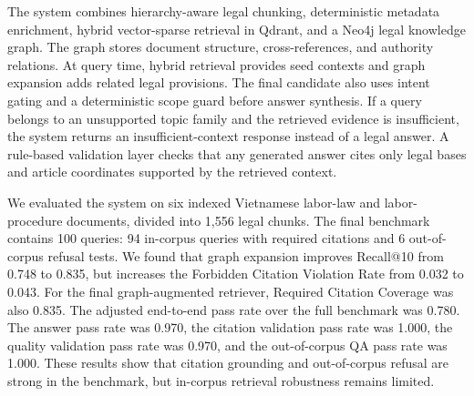 \documentclass[12pt,a4paper,oneside]{report}
\begin{document}
The system combines hierarchy-aware legal chunking, deterministic metadata enrichment, hybrid vector-sparse retrieval in Qdrant, and a Neo4j legal knowledge graph. The graph stores document structure, cross-references, and authority relations. At query time, hybrid retrieval provides seed contexts and graph expansion adds related legal provisions. The final candidate also uses intent gating and a deterministic scope guard before answer synthesis. If a query belongs to an unsupported topic family and the retrieved evidence is insufficient, the system returns an insufficient-context response instead of a legal answer. A rule-based validation layer checks that any generated answer cites only legal bases and article coordinates supported by the retrieved context.

We evaluated the system on six indexed Vietnamese labor-law and labor-procedure documents, divided into 1,556 legal chunks. The final benchmark contains 100 queries: 94 in-corpus queries with required citations and 6 out-of-corpus refusal tests. We found that graph expansion improves Recall@10 from 0.748 to 0.835, but increases the Forbidden Citation Violation Rate from 0.032 to 0.043. For the final graph-augmented retriever, Required Citation Coverage was also 0.835. The adjusted end-to-end pass rate over the full benchmark was 0.780. The answer pass rate was 0.970, the citation validation pass rate was 1.000, the quality validation pass rate was 0.970, and the out-of-corpus QA pass rate was 1.000. These results show that citation grounding and out-of-corpus refusal are strong in the benchmark, but in-corpus retrieval robustness remains limited.


\tableofcontents
\listoffigures
\listoftables
\clearpage










\printbibliography[heading=bibintoc,title={References}]

\appendix

\end{document}
